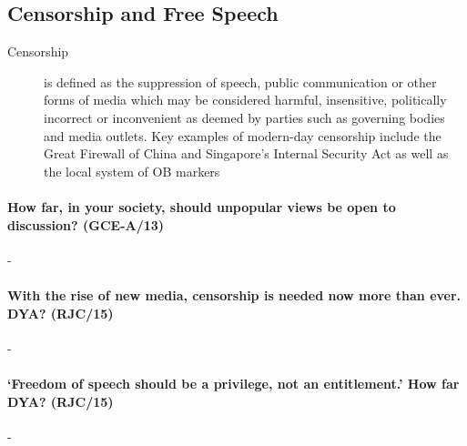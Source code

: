 \documentclass[../../main]{subfiles}
\begin{document}
\subsection{Censorship and Free Speech}

\begin{description}
	\item[Censorship] is defined as the suppression of speech, public communication or other forms of media which may be considered harmful, insensitive, politically incorrect or inconvenient as deemed by parties such as governing bodies and media outlets. Key examples of modern-day censorship include the Great Firewall of China and Singapore's Internal Security Act as well as the local system of OB markers
\end{description}

\paragraph{How far, in your society, should unpopular views be open to discussion? (GCE-A/13)}-

\paragraph{With the rise of new media, censorship is needed now more than ever. DYA? (RJC/15)}-

\paragraph{`Freedom of speech should be a privilege, not an entitlement.' How far DYA? (RJC/15)}-
\end{document}
